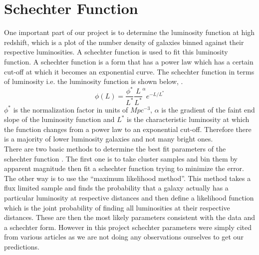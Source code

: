 \documentclass{article}
\begin{document}
\section{Schechter Function}
One important part of our project is to determine the luminosity function at high redshift, which is a plot of the number density of galaxies binned against their respective luminosities. A schechter function is used to fit this luminosity function. A schechter function is a form that has a power law which has a certain cut-off at which it becomes an exponential curve. The schechter function in terms of luminosity i.e. the luminosity function is shown below, \cite{cosmo_number_densities}.
\begin{equation}
\phi(L)=\frac{\phi^{*}}{L^{*}}\frac{L}{L^{*}}^{\alpha}e^{-L/L^{*}}
\label{eq:LumFunc}
\end{equation}
$\phi^{*}$ is the normalization factor in units of $Mpc^{-3}$, $\alpha$ is the gradient of the faint end slope of the luminosity function and $L^{*}$ is the characteristic luminosity at which the function changes from a power law to an exponential cut-off. Therefore there is a majority of lower luminosity galaxies and not many bright ones.\\

There are two basic methods to determine the best fit parameters of the schechter function \cite{luminosity_functions_online}. The first one is to take cluster samples and bin them by apparent magnitude then fit a schechter function trying to minimize the error. The other way is to use the ``maximum likelihood method''. This method takes a flux limited sample and finds the probability that a galaxy actually has a particular luminosity at respective distances and then define a likelihood function which is the joint probability of finding all luminosities at their respective distances. These are then the most likely parameters consistent with the data and a schechter form. However in this project schechter parameters were simply cited from various articles as we are not doing any observations ourselves to get our predictions.\\
\end{document}
